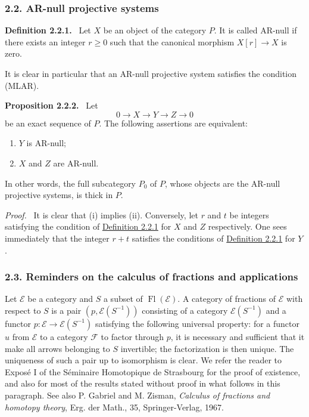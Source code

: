 \documentclass[11pt]{article}
\newenvironment{statement}[1]{\par\medskip\noindent\textbf{#1.}\ }{\par\medskip}
\newenvironment{prooftext}[1][Proof]{\par\noindent\emph{#1.}\ }{\par\medskip}
\providecommand{\Fl}{\operatorname{Fl}}
\providecommand{\cE}{\mathcal E}
\providecommand{\cF}{\mathcal F}
\begin{document}
\subsubsection*{2.2. AR-null projective systems}\label{sga5:V:subsubsection:2.2}
\label{sga5:V:definition:2.2.1}\begin{statement}{Definition 2.2.1}
Let $X$ be an object of the category $P$. It is called AR-null if there exists an integer $r\ge0$ such that the canonical morphism $X[r]\to X$ is zero.
\end{statement}
It is clear in particular that an AR-null projective system satisfies the condition (MLAR).

\label{sga5:V:proposition:2.2.2}\begin{statement}{Proposition 2.2.2}
Let
\[
0\longrightarrow X\longrightarrow Y\longrightarrow Z\longrightarrow0
\]
be an exact sequence of $P$. The following assertions are equivalent:
\begin{enumerate}[label=(\roman*)]
\item $Y$ is AR-null;
\item $X$ and $Z$ are AR-null.
\end{enumerate}
In other words, the full subcategory $P_0$ of $P$, whose objects are the AR-null projective systems, is thick in $P$.
\end{statement}

\begin{prooftext}[Proof]
It is clear that (i) implies (ii). Conversely, let $r$ and $t$ be integers satisfying the condition of \hyperref[sga5:V:definition:2.2.1]{Definition 2.2.1} for $X$ and $Z$ respectively. One sees immediately that the integer $r+t$ satisfies the conditions of \hyperref[sga5:V:definition:2.2.1]{Definition 2.2.1} for $Y$.
\end{prooftext}

\subsubsection*{2.3. Reminders on the calculus of fractions and applications}\label{sga5:V:subsubsection:2.3}
Let $\cE$ be a category and $S$ a subset of $\Fl(\cE)$. A category of fractions of $\cE$ with respect to $S$ is a pair $(p,\cE(S^{-1}))$ consisting of a category $\cE(S^{-1})$ and a functor $p:\cE\to\cE(S^{-1})$ satisfying the following universal property: for a functor $u$ from $\cE$ to a category $\cF$ to factor through $p$, it is necessary and sufficient that it make all arrows belonging to $S$ invertible; the factorization is then unique. The uniqueness of such a pair up to isomorphism is clear. We refer the reader to Exposé I of the Séminaire Homotopique de Strasbourg for the proof of existence, and also for most of the results stated without proof in what follows in this paragraph. See also P. Gabriel and M. Zisman, \emph{Calculus of fractions and homotopy theory}, Erg. der Math., 35, Springer-Verlag, 1967.
\end{document}
